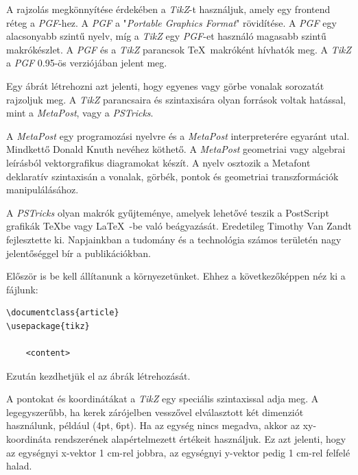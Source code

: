 

A rajzolás megkönnyítése érdekében a \textit{TikZ}-t\cite{tikzmanual}\cite{tikzmanual2} használjuk, amely egy frontend réteg a \textit{PGF}-hez. A \textit{PGF} a "\textit{Portable Graphics Format}" rövidítése. A \textit{PGF} egy alacsonyabb szintű nyelv, míg a \textit{TikZ} egy \textit{PGF}-et használó magasabb szintű makrókészlet. A \textit{PGF} és a \textit{TikZ} parancsok \TeX\ makróként hívhatók meg. A \textit{TikZ} a \textit{PGF} 0.95-ös verziójában jelent meg.

Egy ábrát létrehozni azt jelenti, hogy egyenes vagy görbe vonalak sorozatát rajzoljuk meg. A \textit{TikZ} parancsaira és szintaxisára olyan források voltak hatással, mint a \textit{MetaPost}\cite{metapost}, vagy a \textit{PSTricks}\cite{pstricks}.

A \textit{MetaPost} egy programozási nyelvre és a \textit{MetaPost} interpreterére egyaránt utal. Mindkettő Donald Knuth nevéhez köthető. A \textit{MetaPost} geometriai vagy algebrai leírásból vektorgrafikus diagramokat készít. A nyelv osztozik a Metafont deklaratív szintaxisán a vonalak, görbék, pontok és geometriai transzformációk manipulálásához.

A \textit{PSTricks} olyan makrók gyűjteménye, amelyek lehetővé teszik a PostScript grafikák \TeX\-be vagy \LaTeX\ -be való beágyazását. Eredetileg Timothy Van Zandt fejlesztette ki. Napjainkban a tudomány és a technológia számos területén nagy jelentőséggel bír a publikációkban. 



Először is be kell állítanunk a környezetünket. Ehhez a következőképpen néz ki a fájlunk:

\begin{lstlisting}[style=latex]
\documentclass{article}
\usepackage{tikz}

    <content>

\end{lstlisting}

Ezután kezdhetjük el az ábrák létrehozását. 



A pontokat és koordinátákat a \textit{TikZ} egy speciális szintaxissal adja meg. A legegyszerűbb, ha kerek zárójelben vesszővel elválasztott két dimenziót használunk, például (4pt, 6pt). Ha az egység nincs megadva, akkor az xy-koordináta rendszerének alapértelmezett értékeit használjuk. Ez azt jelenti, hogy az egységnyi x-vektor 1 cm-rel jobbra, az egységnyi y-vektor pedig 1 cm-rel felfelé halad. 

